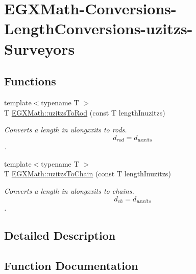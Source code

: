 \hypertarget{group___e_g_x_math-_conversions-_length_conversions-uzitzs-_surveyors}{}\section{E\+G\+X\+Math-\/\+Conversions-\/\+Length\+Conversions-\/uzitzs-\/\+Surveyors}
\label{group___e_g_x_math-_conversions-_length_conversions-uzitzs-_surveyors}
\subsection*{Functions}
\begin{DoxyCompactItemize}
\item 
{\footnotesize template$<$typename T $>$ }\\T \mbox{\hyperlink{group___e_g_x_math-_conversions-_length_conversions-uzitzs-_surveyors_gaf6062ab067930d296074de9e8301871d}{E\+G\+X\+Math\+::uzitzs\+To\+Rod}} (const T length\+Inuzitzs)
\begin{DoxyCompactList}\small\item\em Converts a length in ulongxxits to rods. \[ d_{rod}=d_{uxxits} \]. \end{DoxyCompactList}\item 
{\footnotesize template$<$typename T $>$ }\\T \mbox{\hyperlink{group___e_g_x_math-_conversions-_length_conversions-uzitzs-_surveyors_ga34cbd9480a12684fe4138ba45a56692b}{E\+G\+X\+Math\+::uzitzs\+To\+Chain}} (const T length\+Inuzitzs)
\begin{DoxyCompactList}\small\item\em Converts a length in ulongxxits to chains. \[ d_{ch}=d_{uxxits} \]. \end{DoxyCompactList}\end{DoxyCompactItemize}


\subsection{Detailed Description}


\subsection{Function Documentation}
\mbox{\label{group___e_g_x_math-_conversions-_length_conversions-uzitzs-_surveyors_ga34cbd9480a12684fe4138ba45a56692b}} 
